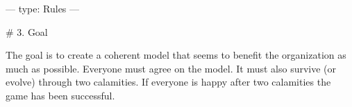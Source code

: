 ---
type: Rules
---

# 3. Goal

The goal is to create a coherent model that seems to benefit the organization as much as possible. Everyone must agree on the model. It must also survive (or evolve) through two calamities.
If everyone is happy after two calamities the game has been successful.
